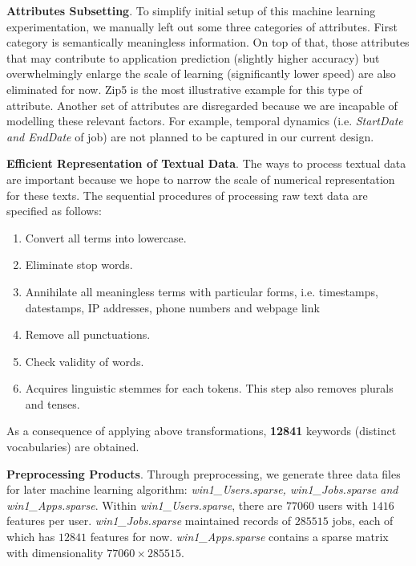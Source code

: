 \documentclass{article} %
\begin{document}
{\bf Attributes Subsetting}.
To simplify initial setup of this machine learning experimentation, we
manually left out some three categories of attributes. First category is
semantically meaningless information. On top of that, those attributes that may contribute to
application prediction (slightly higher accuracy) but overwhelmingly enlarge
the scale of learning (significantly lower speed) are also eliminated for now.
Zip5 is the most illustrative example for this type of attribute.
Another set of attributes are disregarded because we are incapable of
modelling these relevant factors. For example, temporal dynamics (i.e. {\it
    StartDate and EndDate} of job) are not planned to be captured in our
current design. 

{\bf Efficient Representation of Textual Data}.
The ways to process textual data are important because we hope to narrow the
scale of numerical representation for these texts.  The sequential procedures
of processing raw text data are specified as follows:
\begin{enumerate}[label=(\roman*)]
  \item{Convert all terms into lowercase.}
  \item{Eliminate stop words.}
  \item{Annihilate all meaningless terms with particular forms, i.e.
          timestamps, datestamps, IP addresses, phone numbers and webpage link}
  \item{Remove all punctuations.}
  \item{Check validity of words.}
  \item{Acquires linguistic stemmes for each tokens. This step also removes
          plurals and tenses.}
\end{enumerate}
As a consequence of applying above transformations, {\bf 12841}
keywords (distinct vocabularies) are obtained. 

{\bf Preprocessing Products}.
Through preprocessing, we generate three data files for later machine learning
algorithm: {\it win1\_Users.sparse, win1\_Jobs.sparse and win1\_Apps.sparse}.
Within {\it win1\_Users.sparse}, there are $77060$ users with $1416$ features per
user. {\it win1\_Jobs.sparse} maintained records of $285515$ jobs, each of
which has $12841$ features for now. {\it win1\_Apps.sparse} contains a sparse
matrix with dimensionality $77060\times285515$.
\end{document}
